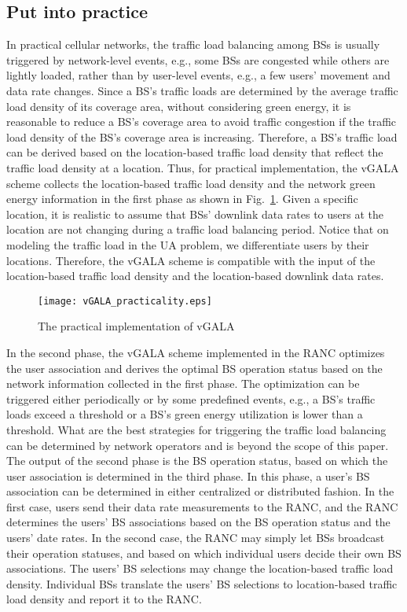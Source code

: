 \documentclass[journal]{IEEEtran}
\theoremstyle{definition}
\begin{document}
\subsection{Put into practice}
\label{subsec:put_into_practice}
In practical cellular networks, the traffic load balancing among BSs is usually triggered by network-level events, e.g., some BSs are congested while others are lightly loaded, rather than by user-level events, e.g., a few users' movement and data rate changes. Since a BS's traffic loads are determined by the average traffic load density of its coverage area, without considering green energy, it is reasonable to reduce a BS's coverage area to avoid traffic congestion if the traffic load density of the BS's coverage area is increasing. Therefore, a BS's traffic load can be derived based on the location-based traffic load density that reflect the traffic load density at a location. Thus, for practical implementation, the vGALA scheme collects the location-based traffic load density and the network green energy information in the first phase as shown in Fig.~\ref{fig:vgala_practic}. Given a specific location, it is realistic to assume that BSs' downlink data rates to users at the location are not changing during a traffic load balancing period. Notice that on modeling the traffic load in the UA problem, we differentiate users by their locations. Therefore, the vGALA scheme is compatible with the input of the location-based traffic load density and the location-based downlink data rates.

\begin{figure}
\centering
\texttt{[image: vGALA\_practicality.eps]}
\caption{The practical implementation of vGALA}
\label{fig:vgala_practic}
\vspace{-16pt}
\end{figure}

In the second phase, the vGALA scheme implemented in the RANC optimizes the user association and derives the optimal BS operation status based on the network information collected in the first phase. The optimization can be triggered either periodically or by some predefined events, e.g., a BS's traffic loads exceed a threshold or a BS's green energy utilization is lower than a threshold. What are the best strategies for triggering the traffic load balancing can be determined by network operators and is beyond the scope of this paper. The output of the second phase is the BS operation status, based on which the user association is determined in the third phase. In this phase, a user's BS association can be determined in either centralized or distributed fashion. In the first case, users send their data rate measurements to the RANC, and the RANC determines the users' BS associations based on the BS operation status and the users' date rates. In the second case, the RANC may simply let BSs broadcast their operation statuses, and based on which individual users decide their own BS associations. The users' BS selections may change the location-based traffic load density. Individual BSs translate the users' BS selections to location-based traffic load density and report it to the RANC.
\end{document}
